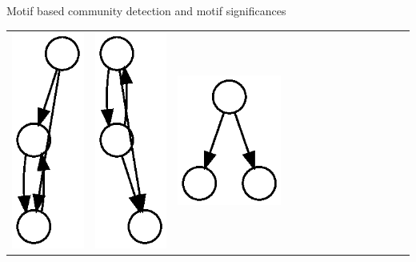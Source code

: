 \documentclass[unknownkeysallowed]{beamer}
\begin{document}
\begin{frame}{Motif based community detection and motif significances}
\begin{tabular}{l|lllllllllllll}
    \includegraphics[height=0.10\textheight]{M6-plain} &
    \includegraphics[height=0.10\textheight]{M7-plain} &
    \includegraphics[height=0.10\textheight]{M8-plain} &

\end{tabular}
\end{frame}
\end{document}
